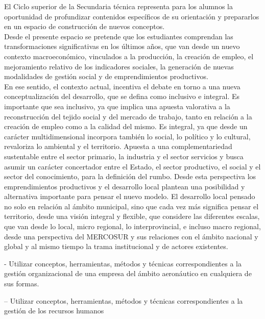 \vspace{8pt}
El Ciclo superior de la Secundaria técnica representa para los alumnos la oportunidad de
profundizar contenidos específicos de su orientación y prepararlos en un espacio de construcción
de nuevos conceptos.\\
Desde el presente espacio se pretende que los estudiantes comprendan las transformaciones
significativas en los últimos años, que van desde un nuevo contexto macroeconómico, vinculados
a la producción, la creación de empleo, el mejoramiento relativo de los indicadores sociales, la
generación de nuevas modalidades de gestión social y de emprendimientos productivos.\\
En ese sentido, el contexto actual, incentiva el debate en torno a una nueva conceptualización
del desarrollo, que se defina como inclusivo e integral. Es importante que sea inclusivo, ya que
implica una apuesta valorativa a la reconstrucción del tejido social y del mercado de trabajo,
tanto en relación a la creación de empleo como a la calidad del mismo. Es integral, ya que desde
un carácter multidimensional incorpora también lo social, lo político y lo cultural, revaloriza lo
ambiental y el territorio. Apuesta a una complementariedad sustentable entre el sector primario,
la industria y el sector servicios y busca asumir un carácter concertador entre el Estado, el
sector productivo, el social y el sector del conocimiento, para la definición del rumbo. Desde esta
perspectiva los emprendimientos productivos y el desarrollo local plantean una posibilidad y
alternativa importante para pensar el nuevo modelo. El desarrollo local pensado no solo en
relación al ámbito municipal, sino que cada vez más significa pensar el territorio, desde una
visión integral y flexible, que considere las diferentes escalas, que van desde lo local, micro
regional, lo interprovincial, e incluso macro regional, desde una perspectiva del MERCOSUR y
sus relaciones con el ámbito nacional y global y al mismo tiempo la trama institucional y de
actores existentes.

\vspace{22pt}

\vspace{10pt}
\hspace*{3pt}- Utilizar conceptos, herramientas, métodos y técnicas correspondientes a la gestión organizacional de
una empresa del ámbito aeronáutico en cualquiera de sus formas.

\vspace{8pt}
\hspace*{3pt}– Utilizar conceptos, herramientas, métodos y técnicas correspondientes a la gestión de los
recursos humanos

